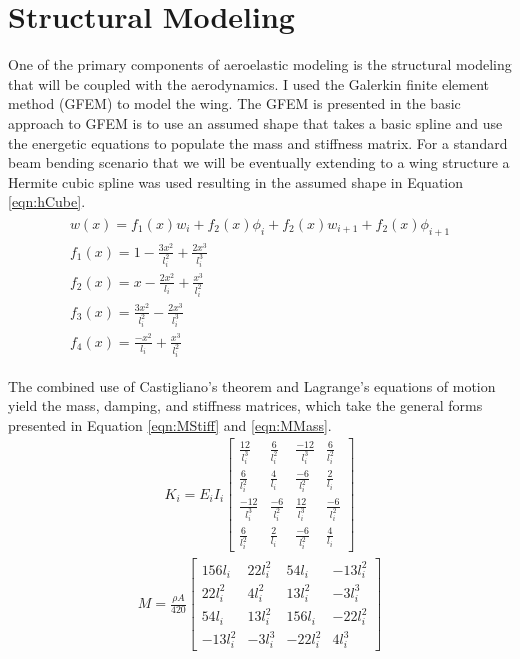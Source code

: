 \documentclass[11pt]{ucthesis}
\begin{document}
\section{Structural Modeling}
One of the primary components of aeroelastic modeling is the structural modeling that will be coupled with the aerodynamics. I used the Galerkin finite element method (GFEM) to model the wing. The GFEM is presented in \cite{fertis1999nonlinear} the basic approach to GFEM is to use an assumed shape that takes a basic spline and use the energetic equations to populate the mass and stiffness matrix. For a standard beam bending scenario that we will be eventually extending to a wing structure a Hermite cubic spline was used resulting in the assumed shape in Equation \ref{eqn:hCube}.
\large
\begin{eqnarray}
    \begin{array}{ll}
        w(x) = f_1(x)w_i +f_2(x)\phi_i+f_2(x)w_{i+1}+f_2(x)\phi_{i+1}\\
        f_1(x) = 1-\frac{3x^2}{l_i^2}+\frac{2x^3}{l_i^3}\\
        f_2(x) = x-\frac{2x^2}{l_i}+\frac{x^3}{l_i^2}\\
        f_3(x) = \frac{3x^2}{l_i^2}-\frac{2x^3}{l_i^3}\\
        f_4(x) = \frac{-x^2}{l_i}+\frac{x^3}{l_i^2}
    \end{array}
\label{eqn:hCube}
\end{eqnarray}
\normalsize

The combined use of Castigliano's theorem and Lagrange's equations of motion yield the mass, damping, and stiffness matrices, which take the general forms presented in Equation \ref{eqn:MStiff} and \ref{eqn:MMass}. 
\begin{eqnarray}
K_i = E_iI_i \begin{bmatrix} 
\frac{12}{l_i^3} & \frac{6}{l_i^2}&\frac{-12}{l_i^3}&\frac{6}{l_i^2}\\ 
\frac{6}{l_i^2}&\frac{4}{l_i}&\frac{-6}{l_i^2}&\frac{2}{l_i}\\ 
\frac{-12}{l_i^3}&\frac{-6}{l_i^2}&\frac{12}{l_i^3}&\frac{-6}{l_i^2}\\ 
\frac{6}{l_i^2}&\frac{2}{l_i}&\frac{-6}{l_i^2}&\frac{4}{l_i}
\end{bmatrix}
\label{eqn:MStiff}
\end{eqnarray}
\begin{eqnarray}
M =  \frac{\rho A}{420}\begin{bmatrix} 
156l_i & 22l_i^2&54l_i&-13l_i^2\\ 
22l_i^2&4l_i^2&13l_i^2&-3l_i^3\\ 
54l_i&13l_i^2&156l_i&-22l_i^2\\
-13l_i^2&-3l_i^3&-22l_i^2&4l_i^3
\end{bmatrix}
\label{eqn:MMass}
\end{eqnarray}
\end{document}
